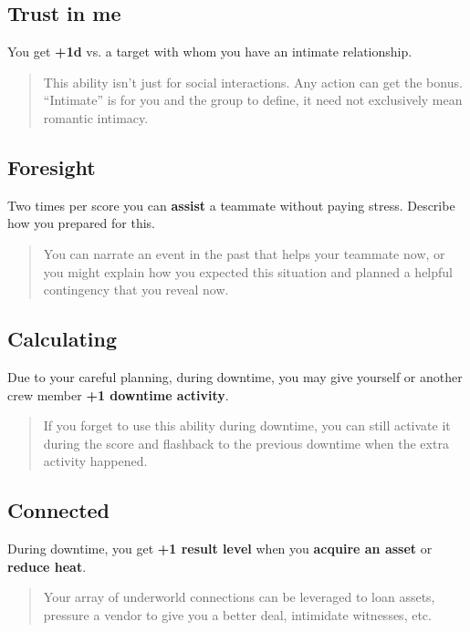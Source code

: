 \documentclass[11pt,oneside]{book}
\begin{document}
\subsection{Trust in me}

You get \textbf{+1d} vs. a target with whom you have an intimate relationship.

\begin{quote}
	This ability isn’t just for social interactions. Any action can get the bonus. “Intimate” is for you and the group to define, it need not exclusively mean romantic intimacy.
\end{quote} 

\subsection{Foresight}

Two times per score you can \textbf{assist} a teammate without paying stress. Describe how you prepared for this.

\begin{quote}
	You can narrate an event in the past that helps your teammate now, or you might explain how you expected this situation and planned a helpful contingency that you reveal now.
\end{quote} 

\subsection{Calculating}

Due to your careful planning, during downtime, you may give yourself or another crew member \textbf{+1 downtime activity}.

\begin{quote}
	If you forget to use this ability during downtime, you can still activate it during the score and flashback to the previous downtime when the extra activity happened.
\end{quote} 

\subsection{Connected}

During downtime, you get \textbf{+1 result level} when you \textbf{acquire an asset} or \textbf{reduce heat}.

\begin{quote}
	Your array of underworld connections can be leveraged to loan assets, pressure a vendor to give you a better deal, intimidate witnesses, etc.
\end{quote} 
\end{document}
